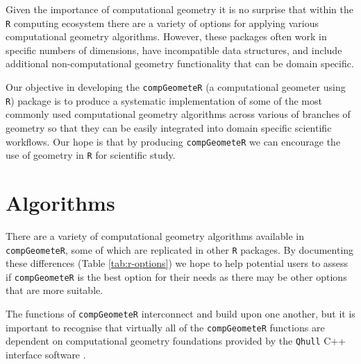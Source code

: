 \documentclass[12pt, a4paper]{article}
\begin{document}
Given the importance of computational geometry it is no surprise that within the \texttt{R} \citep{r-core-team-2019} computing ecosystem there are a variety of options for applying various computational geometry algorithms.  However, these packages often work in specific numbers of dimensions, have incompatible data structures, and include additional non-computational geometry functionality that can be domain specific.

Our objective in developing the \texttt{compGeometeR} (a computational geometer using \texttt{R}) package is to produce a systematic implementation of some of the most commonly used computational geometry algorithms across various of branches of geometry so that they can be easily integrated into domain specific scientific workflows.  Our hope is that by producing \texttt{compGeometeR} we can encourage the use of geometry in \texttt{R} for scientific study.

\section{Algorithms}

There are a variety of computational geometry algorithms available in \texttt{compGeometeR}, some of which are replicated in other \texttt{R} packages.  By documenting these differences (Table \ref{tab:r-options}) we hope to help potential users to assess if \texttt{compGeometeR} is the best option for their needs as there may be other options that are more suitable.

The functions of \texttt{compGeometeR} interconnect and build upon one another, but it is important to recognise that virtually all of the \texttt{compGeometeR} functions are  dependent on computational geometry foundations provided by the \texttt{Qhull} C++ interface software \citep[\url{http://www.qhull.org/}]{barber-1996}.
\end{document}
